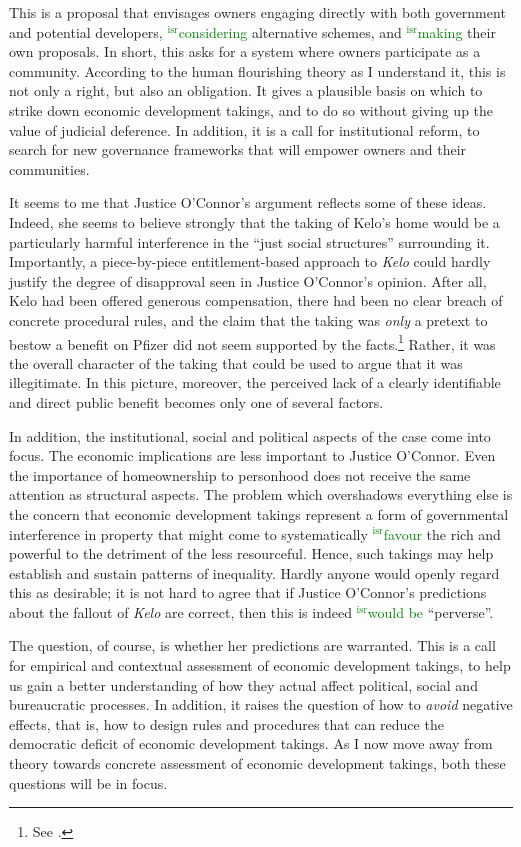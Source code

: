 \documentclass[12pt,a4paper]{book} %
\newcommand{\isr}[1]{\textcolor{green}{$^{\textrm{isr}}${#1}}}
\begin{document}
This is a proposal that envisages owners engaging directly with both government and potential developers, \isr{considering} alternative schemes, and \isr{making} their own proposals. In short, this asks for a system where owners participate as a community. According to the human flourishing theory as I understand it, this is not only a right, but also an obligation. It gives a plausible basis on which to strike down economic development takings, and to do so without giving up the value of judicial deference. In addition, it is a call for institutional reform, to search for new governance frameworks that will empower owners and their communities.

It seems to me that Justice O'Connor's argument reflects some of these ideas. Indeed, she seems to believe strongly that the taking of Kelo's home would be a particularly harmful interference in the ``just social structures'' surrounding it. Importantly, a piece-by-piece entitlement-based approach to {\it Kelo} could hardly justify the degree of disapproval seen in Justice O'Connor's opinion. After all, Kelo had been offered generous compensation, there had been no clear breach of concrete procedural rules, and the claim that the taking was {\it only} a pretext to bestow a benefit on Pfizer did not seem supported by the facts.\footnote{See \cite{bell06}.} Rather, it was the overall character of the taking that could be used to argue that it was illegitimate. In this picture, moreover, the perceived lack of a clearly identifiable and direct public benefit becomes only one of several factors.

In addition, the institutional, social and political aspects of the case come into focus. The economic implications are less important to Justice O'Connor. Even the importance of homeownership to personhood does not receive the same attention as structural aspects. The problem which overshadows everything else is the concern that economic development takings represent a form of governmental interference in property that might come to systematically \isr{favour} the rich and powerful to the detriment of the less resourceful. Hence, such takings may help establish and sustain patterns of inequality. Hardly anyone would openly regard this as desirable; it is not hard to agree that if Justice O'Connor's predictions about the fallout of {\it Kelo} are correct, then this is indeed \isr{would be} ``perverse''. 

The question, of course, is whether her predictions are warranted. This is a call for empirical and contextual assessment of economic development takings, to help us gain a better understanding of how they actual affect political, social and bureaucratic processes. In addition, it raises the question of how to {\it avoid} negative effects, that is, how to design rules and procedures that can reduce the democratic deficit of economic development takings. As I now move away from theory towards concrete assessment of economic development takings, both these questions will be in focus.
\end{document}
